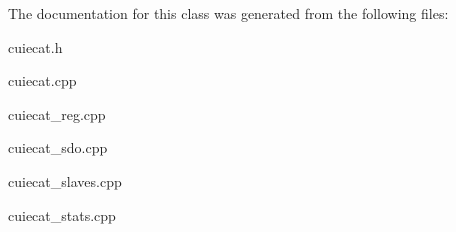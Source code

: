 \begin{DoxyCode}
\end{DoxyCode}
 

The documentation for this class was generated from the following files\-:\begin{DoxyCompactItemize}
\item 
cuiecat.\-h\item 
cuiecat.\-cpp\item 
cuiecat\-\_\-reg.\-cpp\item 
cuiecat\-\_\-sdo.\-cpp\item 
cuiecat\-\_\-slaves.\-cpp\item 
cuiecat\-\_\-stats.\-cpp\end{DoxyCompactItemize}
